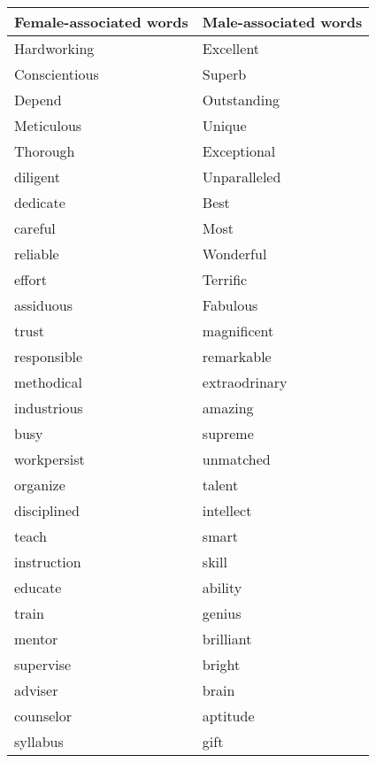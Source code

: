 \documentclass[12pt]{caltech_thesis}
\begin{document}
\begin{longtable}{l|l}
   \hline
   \textbf{Female-associated words} & \textbf{Male-associated words} \\ \hline
   Hardworking                      & Excellent                         \\
   Conscientious                    & Superb                            \\
   Depend                           & Outstanding                      \\
   Meticulous                       & Unique                           \\
   Thorough                         & Exceptional                      \\
   diligent                         & Unparalleled                     \\
   dedicate                         & Best                             \\
   careful                          & Most                             \\
   reliable                         & Wonderful                        \\
   effort                           & Terrific                         \\
   assiduous                        & Fabulous                         \\
   trust                            & magnificent                      \\
   responsible                      & remarkable                       \\
   methodical & extraodrinary \\
   industrious & amazing \\
   busy & supreme \\
   workpersist & unmatched \\
   organize & talent \\
   disciplined & intellect \\
      teach & smart \\ 
   instruction & skill \\ 
   educate & ability \\ 
   train & genius \\
   mentor& brilliant \\
   supervise & bright \\
   adviser &  brain \\
   counselor & aptitude \\ 
   syllabus & gift \\

\end{longtable}
\end{document}
